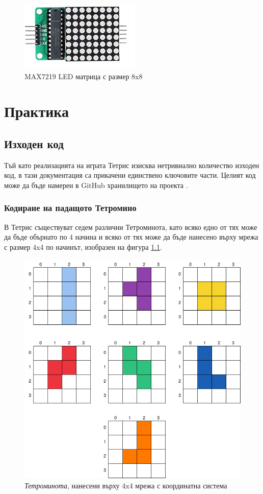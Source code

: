 \documentclass[titlepage, oneside, 14pt]{extbook}
\begin{document}
\begin{figure}[!htbp]
    \centering
    \includegraphics[width=0.5\linewidth]{img/display_generic.png}
    \caption{MAX7219 LED матрица с размер 8x8}
    \label{genericmod}
\end{figure}


\chapter{Практика}

\section{Изходен код}

Тъй като реализацията на играта Тетрис изисква нетривиално количество изходен код,
в тази документация са прикачени единствено ключовите части. Целият код може да
бъде намерен в GitHub хранилището на проекта \cite{github}.

\subsection{Кодиране на падащото Тетромино}

В Тетрис съществуват седем различни Тетроминота, като всяко едно от тях може да бъде обърнато по 4 начина и
всяко от тях може да бъде нанесено върху мрежа с размер 4x4 по начинът, изобразен на фигура \ref{tetrogrid}.

\begin{figure}[!htbp]
    \centering
    \includegraphics[width=0.5\linewidth]{img/tetrominoes_grid.drawio.png}
    \caption{\textit{Тетроминота}, нанесени върху 4x4 мрежа с координатна система}
    \label{tetrogrid}
\end{figure}
\end{document}
